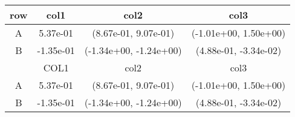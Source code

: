 \begin{tabular}{cccc}
\toprule
row&col1&col2&col3\tabularnewline
\midrule
A&5.37e-01& (8.67e-01, 9.07e-01)& (-1.01e+00, 1.50e+00)\tabularnewline
B&-1.35e-01& (-1.34e+00, -1.24e+00)& (4.88e-01, -3.34e-02)\tabularnewline
\midrule
&COL1&col2&col3\tabularnewline
\midrule
A&5.37e-01& (8.67e-01, 9.07e-01)& (-1.01e+00, 1.50e+00)\tabularnewline
B&-1.35e-01& (-1.34e+00, -1.24e+00)& (4.88e-01, -3.34e-02)\tabularnewline
\bottomrule
\end{tabular}
